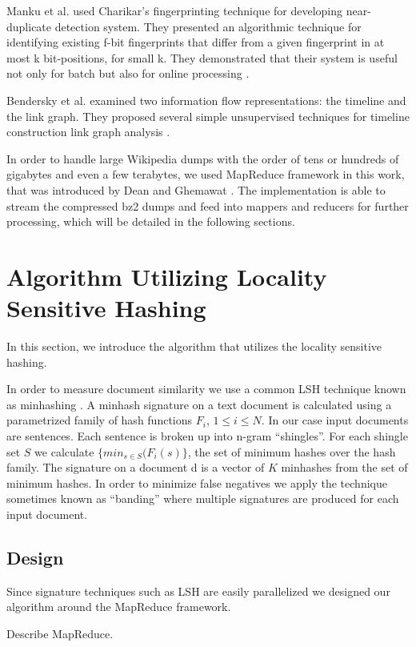 \documentclass{acm_proc_article-sp}
\begin{document}
Manku et al. used Charikar's fingerprinting technique for developing near-duplicate detection system. They presented an algorithmic technique for identifying existing f-bit fingerprints that differ from a given fingerprint in at most k bit-positions, for small k. They demonstrated that their system is useful not only for batch but also for online processing \cite{manku:web}.

Bendersky et al. examined two information flow representations: the timeline and the link graph. They proposed several simple unsupervised techniques for timeline construction link graph analysis \cite{bendersky:timeline}.

In order to handle large Wikipedia dumps with the order of tens or hundreds of gigabytes and even a few terabytes, we used MapReduce framework in this work, that was introduced by Dean and Ghemawat \cite{dean:mapreduce}. The implementation is able to stream the compressed bz2 dumps and feed into mappers and reducers for further processing, which will be detailed in the following sections.

\section{Algorithm Utilizing Locality Sensitive Hashing}

In this section, we introduce the algorithm that utilizes the locality sensitive hashing.

In order to measure document similarity we use a common LSH technique known as minhashing \cite{}. A minhash signature on a text document is calculated using a parametrized family of hash functions $F_i$, $1 \le i \le N$. In our case input documents are sentences. Each sentence is broken up into n-gram ``shingles''. For each shingle set $S$ we calculate $\{min_{s \in S}(F_i(s)\}$, the set of minimum hashes over the hash family. The signature on a document d is a vector of $K$ minhashes from the set of minimum hashes. In order to minimize false negatives we apply the technique sometimes known as ``banding'' \cite{Ullman} where multiple signatures are produced for each input document.

\subsection{Design}
Since signature techniques such as LSH are easily parallelized we designed our algorithm around the MapReduce framework. 

Describe MapReduce.
\end{document}
